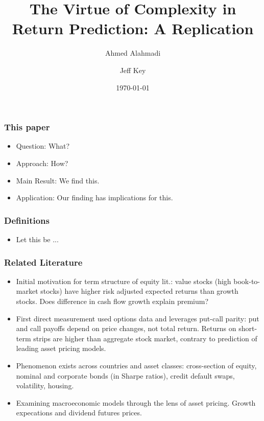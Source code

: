 \documentclass[ignorenonframetext, 9pt]{beamer}
\title[VoC Replication]{
The Virtue of Complexity in Return Prediction: A Replication
}
\author[]{Ahmed Alahmadi \and Jeff Key}
\institute[UChicago]{FINM 32900, The University of Chicago}
\date{\today}
\begin{document}
\begin{frame}
\titlepage
\end{frame}

\begin{frame}
  \frametitle{This paper} %
  \begin{itemize}
  \item \alert{Question:} 
  What?
  \item \alert{Approach:} 
  How?
  \item \alert{Main Result:} 
  We find this.
  \item \alert{Application:}
  Our finding has implications for this.
  \end{itemize}
\end{frame}


\begin{frame}
\frametitle{Definitions}
\begin{itemize}
\item Let this be ...
\end{itemize}
\end{frame}

\begin{frame}
  \frametitle{Related Literature}
  \begin{itemize}
  \item Initial motivation for term structure of equity lit.: value stocks (high book-to-market stocks) have higher risk adjusted expected returns than growth stocks. Does difference in cash flow growth explain premium?
  \\ 
  \item First direct measurement used options data and leverages put-call parity: put and call payoffs depend on price changes, not total return. Returns on short-term strips are higher than aggregate stock market, contrary to prediction of leading asset pricing models.
  \\ 
  \item Phenomenon exists across countries and asset classes: cross-section of equity, nominal and corporate bonds (in Sharpe ratios), credit default swaps, volatility, housing.
  \\ 
  \item Examining macroeconomic models through the lens of asset pricing. Growth expecations and dividend futures prices. 
  \\ 
  \end{itemize}
\end{frame}
\end{document}
